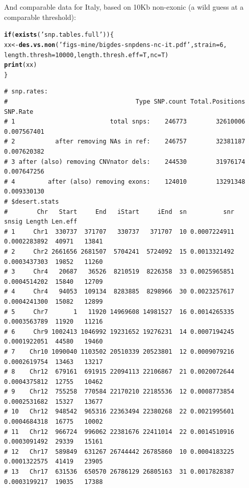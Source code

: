 \documentclass{article}\usepackage[]{graphicx}\usepackage[]{color}
\makeatletter
\newcommand{\hlnum}[1]{\textcolor[rgb]{0.686,0.059,0.569}{#1}}%
\newcommand{\hlstr}[1]{\textcolor[rgb]{0.192,0.494,0.8}{#1}}%
\newcommand{\hlstd}[1]{\textcolor[rgb]{0.345,0.345,0.345}{#1}}%
\newcommand{\hlkwa}[1]{\textcolor[rgb]{0.161,0.373,0.58}{\textbf{#1}}}%
\newcommand{\hlkwb}[1]{\textcolor[rgb]{0.69,0.353,0.396}{#1}}%
\newcommand{\hlkwc}[1]{\textcolor[rgb]{0.333,0.667,0.333}{#1}}%
\newcommand{\hlkwd}[1]{\textcolor[rgb]{0.737,0.353,0.396}{\textbf{#1}}}%
\newenvironment{kframe}{%
 \def\at@end@of@kframe{}%
 \ifinner\ifhmode%
  \def\at@end@of@kframe{\end{minipage}}%
  \begin{minipage}{\columnwidth}%
 \fi\fi%
 \def\FrameCommand##1{\hskip\@totalleftmargin \hskip-\fboxsep
 \colorbox{shadecolor}{##1}\hskip-\fboxsep
     \hskip-\linewidth \hskip-\@totalleftmargin \hskip\columnwidth}%
 \MakeFramed {\advance\hsize-\width
   \@totalleftmargin\z@ \linewidth\hsize
   \@setminipage}}%
 {\par\unskip\endMakeFramed%
 \at@end@of@kframe}
\newenvironment{knitrout}{}{} %
\makeatother
\begin{document}
And comparable data for Italy, based on 10Kb non-exonic (a wild guess at a comparable threshold):

\begin{knitrout}\footnotesize
{}\color{fgcolor}\begin{kframe}
\begin{alltt}
\hlkwa{if}\hlstd{(}\hlkwd{exists}\hlstd{(}\hlstr{'snp.tables.full'}\hlstd{))\{}
  \hlstd{xx} \hlkwb{<-} \hlkwd{des.vs.non}\hlstd{(}\hlstr{'figs-mine/bigdes-snpdens-nc-it.pdf'}\hlstd{,} \hlkwc{strain}\hlstd{=}\hlnum{6}\hlstd{,}
                   \hlkwc{length.thresh}\hlstd{=}\hlnum{10000}\hlstd{,} \hlkwc{length.thresh.eff}\hlstd{=T,} \hlkwc{nc}\hlstd{=T)}
  \hlkwd{print}\hlstd{(xx)}
\hlstd{\}}
\end{alltt}
\begin{verbatim}
# snp.rates:
#                                   Type SNP.count Total.Positions    SNP.Rate
# 1                          total snps:    246773        32610006 0.007567401
# 2           after removing NAs in ref:    246757        32381187 0.007620382
# 3 after (also) removing CNVnator dels:    244530        31976174 0.007647256
# 4         after (also) removing exons:    124010        13291348 0.009330130
# $desert.stats
#        Chr   Start     End   iStart     iEnd  sn          snr        snsig Length Len.eff
# 1     Chr1  330737  371707   330737   371707  10 0.0007224911 0.0002283892  40971   13841
# 2     Chr2 2661656 2681507  5704241  5724092  15 0.0013321492 0.0003437303  19852   11260
# 3     Chr4   20687   36526  8210519  8226358  33 0.0025965851 0.0004514202  15840   12709
# 4     Chr4   94053  109134  8283885  8298966  30 0.0023257617 0.0004241300  15082   12899
# 5     Chr7       1   11920 14969608 14981527  16 0.0014265335 0.0003563789  11920   11216
# 6     Chr9 1002413 1046992 19231652 19276231  14 0.0007194245 0.0001922051  44580   19460
# 7    Chr10 1090040 1103502 20510339 20523801  12 0.0009079216 0.0002619754  13463   13217
# 8    Chr12  679161  691915 22094113 22106867  21 0.0020072644 0.0004375812  12755   10462
# 9    Chr12  755258  770584 22170210 22185536  12 0.0008773854 0.0002531682  15327   13677
# 10   Chr12  948542  965316 22363494 22380268  22 0.0021995601 0.0004684318  16775   10002
# 11   Chr12  966724  996062 22381676 22411014  22 0.0014510916 0.0003091492  29339   15161
# 12   Chr17  589849  631267 26744442 26785860  10 0.0004183225 0.0001322575  41419   23905
# 13   Chr17  631536  650570 26786129 26805163  31 0.0017828387 0.0003199217  19035   17388

\end{verbatim}
\end{kframe}
\end{knitrout}
\end{document}
